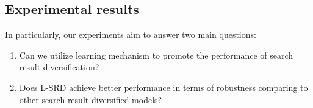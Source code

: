\documentclass[review]{elsarticle}
\begin{document}

\subsection{Experimental results}\label{sec_expres}
In particularly, our experiments aim to answer two main questions:

\begin{enumerate}
\item Can we utilize learning mechanism to promote the performance of search result diversification?
\item Does L-SRD achieve better performance in terms of robustness comparing to other search result diversified models?
\end{enumerate}

\end{document}
